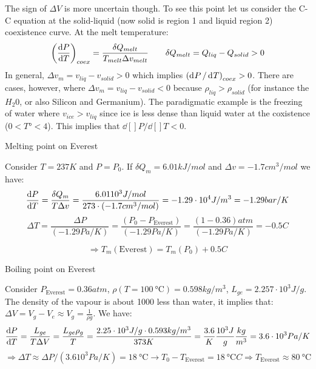 \documentclass[../main/main.tex]{subfiles}
\begin{document}
The sign of \( \Delta V \) is more uncertain though. To see this point let us consider the C-C equation at the solid-liquid (now solid is region 1 and liquid region 2) coexistence curve.
At the melt temperature:
\begin{equation}
  \qty(\dv{P}{T} )_{coex} = \frac{\delta Q_{melt}}{T_{melt}\Delta v_{melt}} \qquad \delta Q_{melt} = Q_{liq} - Q_{solid} > 0
  \label{eq:}
\end{equation}
In general, \( \Delta v_m = v_{liq} - v_{solid} > 0 \) which implies \( \qty( \dd[]{P}/\dd[]{T}   )_{coex} > 0  \). There are cases, however, where \( \Delta v_m = v_{liq} - v_{solid} < 0 \) because \( \rho_{liq} > \rho _{solid} \) (for instance the \( H_2 0 \), or also Silicon and Germanium). The paradigmatic example is the freezing of water where \( v_{ice} > v_{liq} \) since ice is less dense than liquid water at the coxistence (\( 0 < T° < 4 \)). This implies that \( \dd[]{P}/\dd[]{T} < 0   \).

\begin{example}{Melting point on Everest}{}

Consider \( T = 237 K \) and \( P=P_0 \). If \( \delta Q_m = 6.01 kJ/mol \) and \( \Delta v = -1.7 cm^3 /mol  \) we have:
\begin{equation*}
  \dv{P}{T}  = \frac{\delta Q_m}{T \Delta v} = \frac{6.01 10^3 J/mol}{273 \cdot (-1.7 cm^3/mol)} = -1.29 \cdot 10^4 J/m^3 = -1.29 bar/K
  \label{eq:}
\end{equation*}
\begin{equation*}
  \Delta T = \frac{\Delta P}{(-1.29 Pa/K)} = \frac{(P_0 - P_{\text{Everest}})}{(-1.29 Pa/K)} = \frac{(1-0.36)atm}{(-1.29 Pa/K)} = -0.5 C
  \label{eq:}
\end{equation*}
\end{example}
\begin{equation*}
  \Rightarrow T_m ( \text{Everest}) = T_m (P_0) + 0.5 C
  \label{eq:}
\end{equation*}
\begin{example}{Boiling point on Everest}{}

Consider \( P_{\text{Everest}}= 0.36 atm \), \( \rho (T= 100\SI{}{\celsius})=0.598 kg/m^3 \), \( L_{ge} = 2.257 \cdot 10^3 J/g \). The density of the vapour is about 1000 less than water, it implies that: \( \Delta V = V_g - V_e \approx V_g = \frac{1}{\rho g}\). We have:
\begin{equation*}
  \dv{P}{T} = \frac{L_{ge}}{T \Delta V} = \frac{L_{ge} \rho _g}{T} = \frac{2.25 \cdot 10^3 J/g \cdot 0.593 kg/m^3}{373 K} = \frac{3.6}{K} \frac{10^3 J}{g} \frac{kg}{m^3} = 3.6 \cdot 10^3 Pa/K
  \label{eq:}
\end{equation*}
\begin{equation*}
  \Rightarrow \Delta T \approx \Delta P/(3.6 10^3 Pa/K) = 18 \SI{}{\celsius}   \rightarrow T_0 - T_{\text{Everest}} = 18\SI{}{\celsius} C \Rightarrow T_{\text{Everest}}\approx 80\SI{}{\celsius}
  \label{eq:}
\end{equation*}
\end{example}
\end{document}
